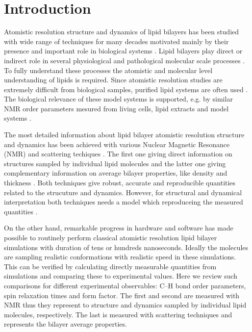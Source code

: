 \documentclass[aps,prl,superscriptaddress,twocolumn]{revtex4}
\begin{document}

\maketitle %



\section{Introduction}
Atomistic resolution structure and dynamics of lipid bilayers has been studied
with wide range of techniques for many decades motivated mainly
by their presence and important role in biological systems \cite{??}.
Lipid bilayers play direct or indirect role in several physiological and pathological
molecular scale processes \cite{??}. To fully understand these processes the atomistic and
molecular level understanding of lipids is required. Since atomistic resolution studies are
extremely difficult from biological samples, purified lipid systems are often used \cite{??}.
The biological relevance of these model systems is supported, e.g. by similar NMR order parameters 
mesured from living cells, lipid extracts and model systems \cite{??}. 

The most detailed information about lipid bilayer atomistic resolution structure and dynamics has been
achieved with various Nuclear Magnetic Resonance (NMR) and scattering techiques \cite{??}. 
The first one giving direct information on structures sampled by individual lipid molecules \cite{??} and
the latter one giving complementary information on average bilayer properties, like density and thickness \cite{??}.
Both techniques give robust, accurate and reproducible quantities related to the strucuture and dynamics.
However, for structural and dynamical interpretation both techniques needs a model which reproduceing 
the measured quantities \cite{??}. 

On the other hand, remarkable progress in hardware and software has made possible to 
routinely perform classical atomistic resolution lipid bilayer simulations with 
duration of tens or hundreds nanoseconds. Ideally the molecules are sampling realistic
conformations with realistic speed in these simulations. This can be verified by calculating
directly measurable quantities from simulations and comparing these to experimental values.
Here we review such comparisons for different experimental observables: C--H bond order parameters,
spin relaxation times and form factor. The first and second are measured with NMR thus they 
represent to structure and dynamics sampled by individual lipid molecules, respectively.
The last is measured with scattering techniques and represents the bilayer average properties.
 
\end{document}
